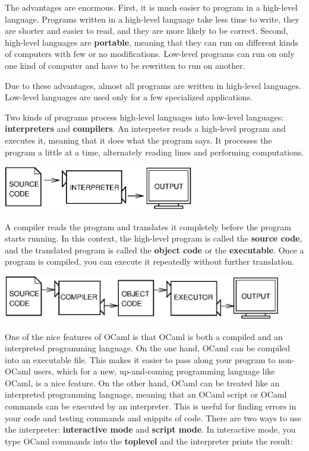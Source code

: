 \documentclass[10pt]{book}
\begin{document}

The advantages are enormous.  First, it is much easier to program
in a high-level language.  Programs written in a high-level language
take less time to write, they are shorter and easier to read, and they
are more likely to be correct.  Second, high-level languages are {\bf
portable}, meaning that they can run on different kinds of computers
with few or no modifications.  Low-level programs can run on only one
kind of computer and have to be rewritten to run on another.

Due to these advantages, almost all programs are written in high-level
languages.  Low-level languages are used only for a few specialized
applications.


Two kinds of programs process high-level languages
into low-level languages: {\bf interpreters} and {\bf compilers}.
An interpreter reads a high-level program and executes it, meaning that it
does what the program says.  It processes the program a little at a time,
alternately reading lines and performing computations.

\beforefig
\centerline{\includegraphics[height=0.77in]{figs/interpret.eps}}
\afterfig


A compiler reads the program and translates it completely before the program 
starts running.  In this context, the high-level program is called the {\bf source 
code}, and the translated program is called the {\bf object code} or the {\bf executable}.  
Once a program is compiled, you can execute it repeatedly without further translation.

\beforefig
\centerline{\includegraphics[height=0.77in]{figs/compile.eps}}
\afterfig

One of the nice features of OCaml is that OCaml is both a compiled and an interpreted 
programming language. On the one hand, OCaml can be compiled into an executable file. 
This makes it easier to pass along your program to non-OCaml users, which for a new, 
up-and-coming programming language like OCaml, is a nice feature. On the other hand, 
OCaml can be treated like an interpreted programming language, meaning that an OCaml 
script or OCaml commands can be executed by an interpreter. This is useful for finding 
errors in your code and testing commands and snippits of code. There are two ways to use 
the interpreter: {\bf interactive mode} and {\bf script mode}. In interactive mode, you 
type OCaml commands into the {\bf toplevel} and the interpreter prints the result:
\end{document}
